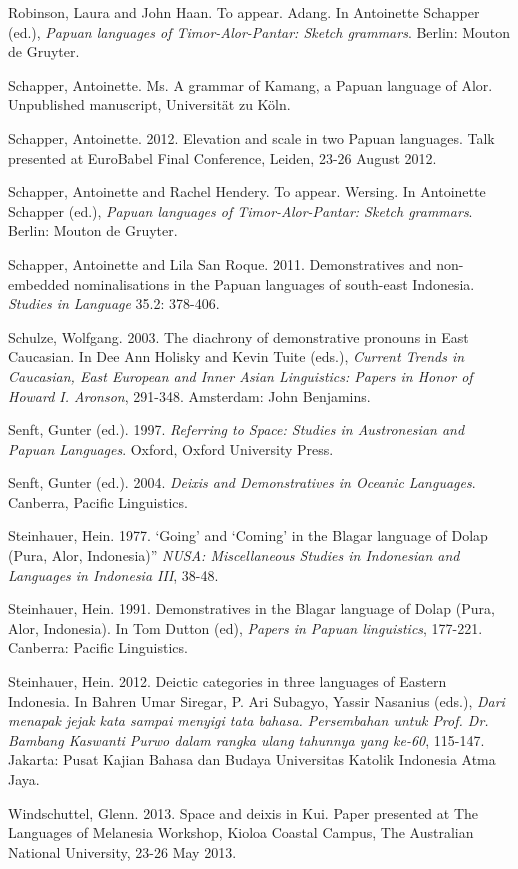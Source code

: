 Robinson, Laura and John Haan. To appear. Adang. In Antoinette Schapper (ed.), \textit{Papuan languages of Timor-Alor-Pantar: Sketch grammars}. Berlin: Mouton de Gruyter. 

Schapper, Antoinette. Ms. A grammar of Kamang, a Papuan language of Alor. Unpublished manuscript, Universit\"at zu K\"oln. 

Schapper, Antoinette. 2012. Elevation and scale in two Papuan languages. Talk presented at EuroBabel Final Conference, Leiden, 23-26 August 2012.

Schapper, Antoinette and Rachel Hendery. To appear. Wersing. In Antoinette Schapper (ed.), \textit{Papuan languages of Timor-Alor-Pantar: Sketch grammars}. Berlin: Mouton de Gruyter.

Schapper, Antoinette and Lila San Roque. 2011. Demonstratives and non-embedded nominalisations in the Papuan languages of south-east Indonesia. \textit{Studies in Language} 35.2: 378-406.

Schulze, Wolfgang. 2003. The diachrony of demonstrative pronouns in East Caucasian. In Dee Ann Holisky and Kevin Tuite (eds.), \textit{Current Trends in Caucasian, East European and Inner Asian Linguistics: Papers in Honor of Howard I. Aronson}, 291-348. Amsterdam: John Benjamins.

Senft, Gunter (ed.). 1997. \textit{Referring to Space: Studies in Austronesian and Papuan Languages}. Oxford, Oxford University Press. 

Senft, Gunter (ed.). 2004. \textit{Deixis and Demonstratives in Oceanic Languages}. Canberra, Pacific Linguistics.

Steinhauer, Hein. 1977. {\textquoteleft}Going{\textquoteright} and {\textquoteleft}Coming{\textquoteright} in the Blagar language of Dolap (Pura, Alor, Indonesia){\textquotedblright} \textit{NUSA: Miscellaneous Studies in Indonesian and Languages in Indonesia III}, 38-48.

Steinhauer, Hein. 1991. Demonstratives in the Blagar language of Dolap (Pura, Alor, Indonesia). In Tom Dutton (ed), \textit{Papers in Papuan linguistics}, 177-221. Canberra: Pacific Linguistics.

Steinhauer, Hein. 2012. Deictic categories in three languages of Eastern Indonesia. In Bahren Umar Siregar, P. Ari Subagyo, Yassir Nasanius (eds.), \textit{Dari menapak jejak kata sampai menyigi tata bahasa. Persembahan untuk Prof. Dr. Bambang Kaswanti Purwo dalam rangka ulang tahunnya yang ke-60}, 115-147. Jakarta: Pusat Kajian Bahasa dan Budaya Universitas Katolik Indonesia Atma Jaya.

Windschuttel, Glenn. 2013. Space and deixis in Kui. Paper presented at The Languages of Melanesia Workshop, Kioloa Coastal Campus, The Australian National University, 23-26 May 2013.
